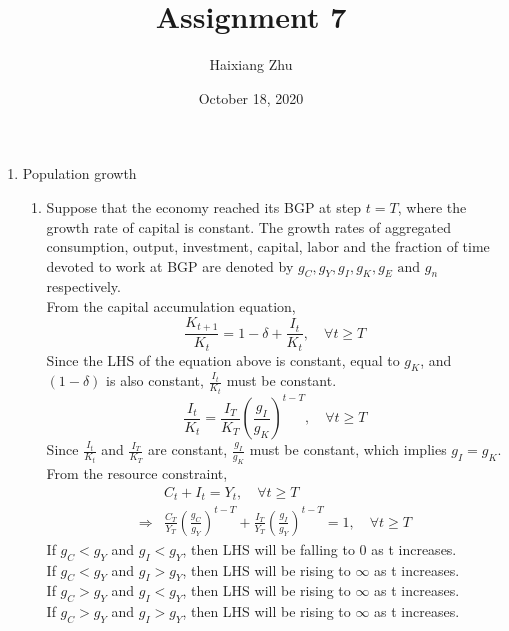 \documentclass{article}
\title{Assignment 7}
\date{October 18, 2020}
\author{Haixiang Zhu}
\begin{document}
    \maketitle
    \renewcommand{\arraystretch}{1.2}
    \begin{enumerate}
        \item Population growth
        \begin{enumerate}
            \item Suppose that the economy reached its BGP at step $t=T$, where the growth rate of capital is constant. The growth rates of aggregated consumption, output, investment,
            capital, labor and the fraction of time devoted to work at BGP are denoted by $g_C, g_Y, g_I, g_K, g_E\text{ and }g_n$ respectively. \\
            From the capital accumulation equation, 
            \begin{equation*}
                \frac{K_{t+1}}{K_t}=1-\delta+\frac{I_t}{K_t},\quad\forall t\ge T
            \end{equation*}
            Since the LHS of the equation above is constant, equal to $g_K$, and $(1-\delta)$ is also constant, $\frac{I_t}{K_t}$ must be constant. 
            \begin{equation*}
                \frac{I_t}{K_t}=\frac{I_T}{K_T}\left(\frac{g_I}{g_K}\right)^{t-T},\quad\forall t\ge T
            \end{equation*}
            Since $\frac{I_t}{K_t}$ and $\frac{I_T}{K_T}$ are constant, $\frac{g_I}{g_K}$ must be constant, which implies $g_I=g_K$. \\
            From the resource constraint, 
            \begin{align*}
                &C_t+I_t=Y_t,\quad\forall t\ge T\\
                \Rightarrow&\frac{C_T}{Y_T}\left(\frac{g_C}{g_Y}\right)^{t-T}+\frac{I_T}{Y_T}\left(\frac{g_I}{g_Y}\right)^{t-T}=1,\quad\forall t\ge T
            \end{align*}
            If $g_C<g_Y$ and $g_I<g_Y$, then LHS will be falling to $0$ as t increases.\\
            If $g_C<g_Y$ and $g_I>g_Y$, then LHS will be rising to $\infty$ as t increases.\\
            If $g_C>g_Y$ and $g_I<g_Y$, then LHS will be rising to $\infty$ as t increases.\\
            If $g_C>g_Y$ and $g_I>g_Y$, then LHS will be rising to $\infty$ as t increases.\\

\end{enumerate}
\end{enumerate}
\end{document}
